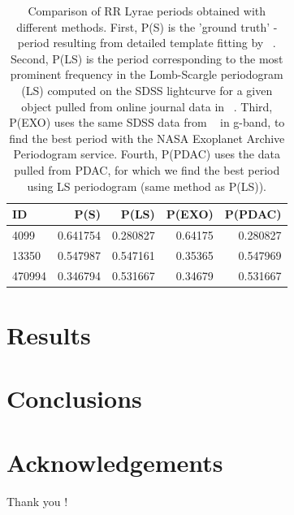 \documentclass[fleqn,usenatbib]{mnras} %
\begin{document}
\begin{table}
\centering
\caption{Comparison of RR Lyrae periods obtained with different methods. First, P(S) is the 'ground truth' -  period resulting from detailed template fitting by ~\citep{sesar2010}. Second, P(LS) is the period corresponding to the most prominent frequency in the Lomb-Scargle periodogram  (LS) computed on the SDSS lightcurve for a given object pulled from online journal data in ~\citep{sesar2010}. Third, P(EXO) uses the same SDSS data from ~\citep{sesar2010} in g-band, to find the best period with the NASA Exoplanet Archive Periodogram service.  Fourth, P(PDAC) uses the data pulled from PDAC, for which we find  the best period using  LS periodogram (same method as P(LS)).}
\label{tab:periods}
\begin{tabular}{ l|rrrr } 
\hline
 ID      & P(S)         & P(LS)      & P(EXO)       & P(PDAC) \\ 
\hline
 4099    & 0.641754     & 0.280827   & 0.64175      &  0.280827 \\ 
 13350   & 0.547987     & 0.547161   & 0.35365      &  0.547969  \\ 
 470994  & 0.346794     & 0.531667   & 0.34679      &  0.531667  \\ 
\end{tabular}
\end{table}






\section{Results}

\section{Conclusions}

\section*{Acknowledgements}
Thank you ! 
\end{document}
